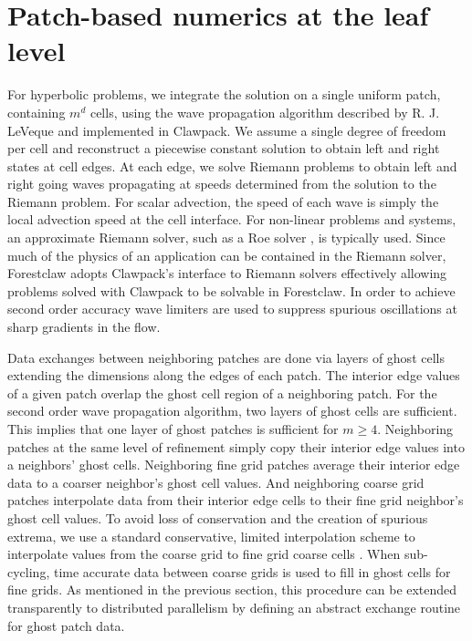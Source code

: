 \documentclass{IOS-Book-Article}     %
\newcommand{\todo}[1]{\textcolor{red}{[TODO: #1]}\xspace}
\newcommand{\clawpack}{{\sc Clawpack}\xspace}
\newcommand{\forestclaw}{Forestclaw\xspace}
\newcommand{\pforest}{\texttt{p4est}\xspace}
\begin{document}


\section{Patch-based numerics at the leaf level}


For hyperbolic problems, we integrate the solution on a single uniform patch,
containing $m^d$ cells, using the wave propagation algorithm described by R. J.
LeVeque \cite{LeVeque:1997eg} and implemented in \clawpack \cite{le:2002,
clawpack}.  We assume a single degree of freedom per cell and reconstruct a
piecewise constant solution to obtain left and right states at cell edges.  At
each edge, we solve Riemann problems to obtain left and right going waves
propagating at speeds determined from the solution to the Riemann problem.  For
scalar advection, the speed of each wave is simply the local advection speed at
the cell interface.  For non-linear problems and systems, an approximate
Riemann solver, such as a Roe solver \cite{roesolver}, is typically used.  Since
much of the physics of an application can be contained in the Riemann solver,
\forestclaw adopts \clawpack's interface to Riemann solvers effectively allowing
problems solved with \clawpack to be solvable in \forestclaw.  In order to
achieve second order accuracy wave limiters are used to suppress spurious
oscillations at sharp gradients in the flow.

Data exchanges between neighboring patches are done via layers of
ghost cells extending the dimensions along the edges of each patch.
The interior edge values of a given patch overlap the ghost cell
region of a neighboring patch.  For the second order wave propagation
algorithm, two layers of ghost cells are sufficient.  This implies that
one layer of ghost patches is sufficient for $m \ge 4$.  Neighboring
patches at the same level of refinement simply copy their interior
edge values into a neighbors' ghost cells.  Neighboring fine grid
patches average their interior edge data to a coarser neighbor's ghost
cell values.  And neighboring coarse grid patches interpolate data
from their interior edge cells to their fine grid neighbor's ghost
cell values.  To avoid loss of conservation and the creation of
spurious extrema, we use a standard conservative, limited
interpolation scheme to interpolate values from the coarse grid to
fine grid coarse cells \cite{amrclaw, chombo}.  When sub-cycling, time accurate
data between coarse grids is used to fill in ghost cells for fine grids.
As mentioned in the previous section, this procedure can be extended
transparently to distributed parallelism by defining an abstract exchange
routine for ghost patch data.
\end{document}
